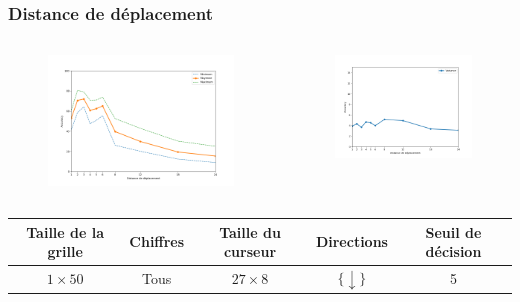 \documentclass{beamer}
\begin{document}
\begin{frame}
    \frametitle{Distance de déplacement}
    \begin{columns}[c]
        \begin{column}{.5\textwidth}
            \begin{figure}
                \includegraphics[height=0.5\textheight]{movedist_acc_mean.png}
            \end{figure}
        \end{column}
        \begin{column}{.5\textwidth}
            \begin{figure}
                \includegraphics[height=0.45\textheight]{movedist_acc_std.png}
            \end{figure}
        \end{column}
    \end{columns}
    \center
    \fontsize{7pt}{7}\selectfont
    \begin{tabu}{|c|c|c|c|c|}\hline
        Taille de la grille & Chiffres & Taille du curseur & Directions & Seuil de décision \\ \hline
        $1 \times 50$ & Tous & $27 \times 8$ & $\{\downarrow\}$ & 5 \\ \hline
    \end{tabu}
    \vspace{6em}
\end{frame}
\end{document}
